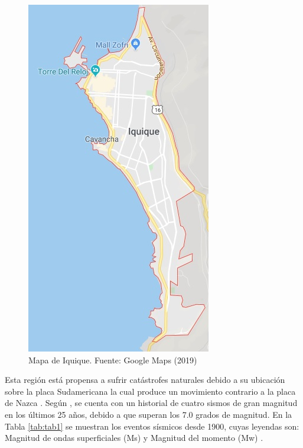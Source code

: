 \documentclass[letterpaper,conference]{IEEEtran}
\begin{document}
\begin{figure}[h!]
\centering
\includegraphics[scale=0.5]{Figuras/iquique1.jpg}
\caption{Mapa de Iquique. Fuente: Google Maps (2019)}
\label{fig:fig2}
\end{figure}

Esta región está propensa a sufrir catástrofes naturales debido a su ubicación sobre la placa Sudamericana la cual produce un movimiento contrario a la placa de Nazca \citep{sismologia}. Según \citet{emdat}, se cuenta con un historial de cuatro sismos de gran magnitud en los últimos 25 años, debido a que superan los 7.0 grados de magnitud. En la Tabla \ref{tab:tab1} se muestran los eventos sísmicos desde 1900, cuyas leyendas son: Magnitud de ondas superficiales (Ms) y Magnitud del momento (Mw) \citep{sismologia}.
\end{document}
